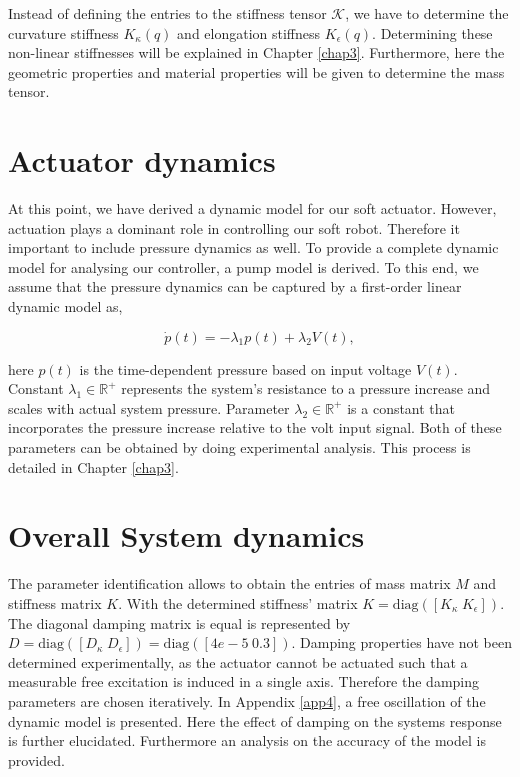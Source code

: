 Instead of defining the entries to the stiffness tensor $\mathcal{K}$, we have to determine the curvature stiffness $K_\kappa(q)$ and elongation stiffness $K_\epsilon(q)$. Determining these non-linear stiffnesses will be explained in Chapter \ref{chap3}. Furthermore, here the geometric properties and material properties will be given to determine the mass tensor. 




\section{Actuator dynamics}

At this point, we have derived a dynamic model for our soft actuator. However, actuation plays a dominant role in controlling our soft robot. Therefore it important to include pressure dynamics as well. To provide a complete dynamic model for analysing our controller, a pump model is derived. To this end, we assume that the pressure dynamics can be captured by a first-order linear dynamic model as,

\begin{equation}
    \dot{p}(t) = -\lambda_1 p(t) + \lambda_2 V(t),
\end{equation}

here $p(t)$ is the time-dependent pressure based on input voltage $V(t)$. Constant $\lambda_1 \in \mathbb{R}^+$ represents the system's resistance to a pressure increase and scales with actual system pressure. Parameter $\lambda_2 \in \mathbb{R}^+$ is a constant that incorporates the pressure increase relative to the volt input signal. Both of these parameters can be obtained by doing experimental analysis. This process is detailed in Chapter \ref{chap3}.



\section{Overall System dynamics}

The parameter identification allows to obtain the entries of mass matrix $M$ and stiffness matrix $K$. With the determined stiffness' matrix $K = \text{diag}([K_\kappa \hspace{3pt} K_\epsilon])$. The diagonal damping matrix is equal is represented by $D = \text{diag}([D_\kappa \hspace{3pt} D_\epsilon]) = \text{diag}([4e-5 \hspace{3pt} 0.3])$. Damping properties have not been determined experimentally, as the actuator cannot be actuated such that a measurable free excitation is induced in a single axis. Therefore the damping parameters are chosen iteratively. In Appendix \ref{app4}, a free oscillation of the dynamic model is presented. Here the effect of damping on the systems response is further elucidated. Furthermore an analysis on the accuracy of the model is provided.


